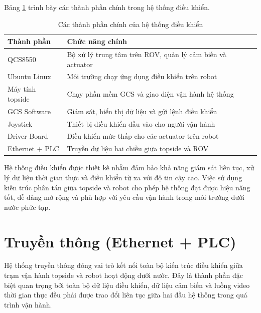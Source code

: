 \documentclass[../DoAn.tex]{subfiles}
\begin{document}
Bảng \ref{tab:controller_system} trình bày các thành phần chính trong hệ thống điều khiển.

\begin{table}[H]
\centering
\caption{Các thành phần chính của hệ thống điều khiển}
\label{tab:controller_system}
\begin{tabular}{|p{4cm}|p{9cm}|}
\hline
\textbf{Thành phần} & \textbf{Chức năng chính} \\ \hline

QCS8550 &
Bộ xử lý trung tâm trên ROV, quản lý cảm biến và actuator \\ \hline

Ubuntu Linux &
Môi trường chạy ứng dụng điều khiển trên robot \\ \hline

Máy tính topside &
Chạy phần mềm GCS và giao diện vận hành hệ thống \\ \hline

GCS Software &
Giám sát, hiển thị dữ liệu và gửi lệnh điều khiển \\ \hline

Joystick &
Thiết bị điều khiển đầu vào cho người vận hành \\ \hline

Driver Board &
Điều khiển mức thấp cho các actuator trên robot \\ \hline

Ethernet + PLC &
Truyền dữ liệu hai chiều giữa topside và ROV \\ \hline

\end{tabular}
\end{table}

Hệ thống điều khiển được thiết kế nhằm đảm bảo khả năng giám sát liên tục, xử lý dữ liệu thời gian thực và điều khiển từ xa với độ tin cậy cao. Việc sử dụng kiến trúc phân tán giữa topside và robot cho phép hệ thống đạt được hiệu năng tốt, dễ dàng mở rộng và phù hợp với yêu cầu vận hành trong môi trường dưới nước phức tạp.
\section{Truyền thông (Ethernet + PLC)}
\label{section:2.7}

Hệ thống truyền thông đóng vai trò kết nối toàn bộ kiến trúc điều khiển giữa trạm vận hành topside và robot hoạt động dưới nước. Đây là thành phần đặc biệt quan trọng bởi toàn bộ dữ liệu điều khiển, dữ liệu cảm biến và luồng video thời gian thực đều phải được trao đổi liên tục giữa hai đầu hệ thống trong quá trình vận hành.
\end{document}
